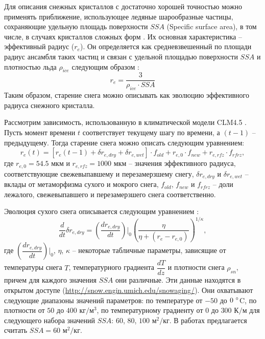 \documentclass[a4paper, fontsize=14pt]{scrartcl}
\begin{document}
Для описания снежных кристаллов с достаточно хорошей точностью можно применять приближение, использующее ледяные шарообразные частицы, сохраняющие удельную площадь поверхности $SSA$ (Specific surface area), в том числе, в случаях кристаллов сложных форм \cite{Grenfell1999}. Их основная характеристика -- эффективный радиус ($r_e$). Он определяется как средневзвешенный по площади радиус ансамбля таких частиц и связан с удельной площадью поверхности $SSA$ и плотностью льда $\rho_{ice}$ следующим образом \cite{Flanner2006}:  
\begin{equation}
    r_e = \dfrac{3} {\rho_{ice} \cdot SSA} \label{sys}
\end{equation}
Таким образом, старение снега можно описывать как эволюцию эффективного радиуса снежного кристалла.

Рассмотрим зависимость, использованную в климатической модели CLM4.5 \cite{CLM4.5tech}. Пусть момент времени $t$ соответствует текущему шагу по времени, а $(t - 1)$ -- предыдущему. Тогда старение снега можно описать следующим уравнением:
\begin{equation}
    r_e(t) = [r_e (t - 1) + \delta r_{e , dry} + \delta r_{e , wet} ] \cdot f_{old} + r_{e ,0} \cdot f_{new} + r_{e , rfz} \cdot f_{rfrz}, \label{sysRDS1}
\end{equation}
где $ r_{e ,0} = 54.5 $ мкм и $r_{e , rfz} = 1000 $ мкм -- значения эффективного радиуса, соответствующие свежевыпавшему и перезамерзшему снегу, $\delta r_{e , dry}$ и $\delta r_{e , wet}$ -- вклады от метаморфизма сухого и мокрого снега, $f_{old}$, $f_{new}$ и $f_{rfrz}$ -- доли лежалого, свежевыпавшего и перезамерзшего снега соответственно.  

Эволюция сухого снега описывается следующим уравнением \cite{Flanner2006, Flanner2007, CLM4.5tech}:
\begin{equation}
    \dfrac{d}{dt} \delta r_{e , dry} = {\left( \dfrac{dr_{e , dry}}{dt} \right)}\bigg|_0 \left(\dfrac{\eta}{\eta + (r_e - r_{e, 0})}\right)^{1 / \kappa}, \label{sys}
\end{equation}
где ${\left( \dfrac{dr_{e , dry}}{dt} \right)}\bigg|_0$, $\eta$, $\kappa$ -- некоторые табличные параметры, зависящие от температуры снега $T$, температурного градиента $\dfrac{dT}{dz}$ и плотности снега $\rho_{sn}$, причем для каждого значения $SSA$ они различные. Эти данные находятся в открытом доступе (\url{http://snow.engin.umich.edu/snowaging/}). Они охватывают следующие диапазоны значений параметров: по температуре от $-50$ до $0 ~\degree$C, по плотности от $50$ до $400$ кг$/$м$^3$, по температурному градиенту от $0$ до $300$ К$/$м для следующего набора значений $SSA$: $60$, $80$, $100$ м$^2/$кг. В работах \cite{CLM4.5tech, Flanner2006, Flanner2007} предлагается считать $SSA = 60$ м$^2/$кг.
\end{document}
